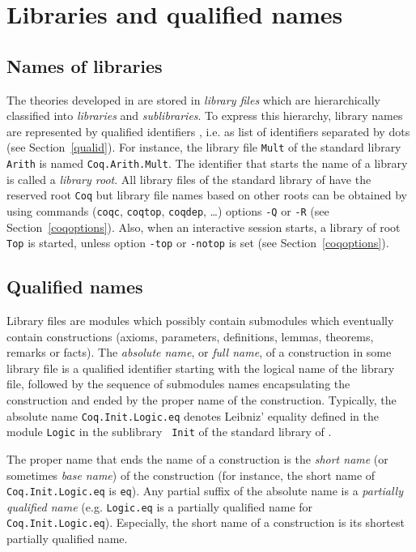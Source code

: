 

\section{Libraries and qualified names}

\subsection{Names of libraries
\label{Libraries}
}

The theories developed in {\Coq} are stored in {\em library files}
which are hierarchically classified into {\em libraries} and {\em
  sublibraries}. To express this hierarchy, library names are
represented by qualified identifiers {\qualid}, i.e. as list of
identifiers separated by dots (see Section~\ref{qualid}). For
instance, the library file {\tt Mult} of the standard {\Coq} library
{\tt Arith} is named {\tt Coq.Arith.Mult}. The identifier that starts
the name of a library is called a {\em library root}.  All library
files of the standard library of {\Coq} have the reserved root {\tt Coq}
but library file names based on other roots can be obtained by using
{\Coq} commands ({\tt coqc}, {\tt coqtop}, {\tt coqdep}, \dots) options
{\tt -Q} or {\tt -R} (see Section~\ref{coqoptions}). Also, when an
interactive {\Coq} session starts, a library of root {\tt Top} is
started, unless option {\tt -top} or {\tt -notop} is set (see
Section~\ref{coqoptions}).

\subsection{Qualified names
\label{LongNames}
}

Library files are modules which possibly contain submodules which
eventually contain constructions (axioms, parameters, definitions,
lemmas, theorems, remarks or facts). The {\em absolute name}, or {\em
full name}, of a construction in some library file is a qualified
identifier starting with the logical name of the library file,
followed by the sequence of submodules names encapsulating the
construction and ended by the proper name of the construction.
Typically, the absolute name {\tt Coq.Init.Logic.eq} denotes Leibniz'
equality defined in the module {\tt Logic} in the sublibrary {\tt
Init} of the standard library of \Coq.

The proper name that ends the name of a construction is the {\it short
name} (or sometimes {\it base name}) of the construction (for
instance, the short name of {\tt Coq.Init.Logic.eq} is {\tt eq}). Any
partial suffix of the absolute name is a {\em partially qualified name}
(e.g. {\tt Logic.eq} is a partially qualified name for {\tt
Coq.Init.Logic.eq}).  Especially, the short name of a construction is
its shortest partially qualified name.


